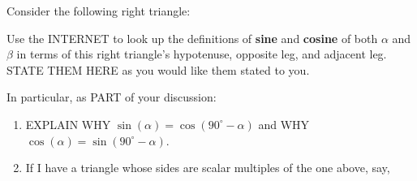 \documentclass[handout,noauthor,nooutcomes,12pt,hints]{ximera}
\begin{document}
\begin{question}
  Consider the following right triangle:
  \begin{center}
    \end{center}
  Use the INTERNET to look up the definitions of \textbf{sine} and
  \textbf{cosine} of both $\alpha$ and $\beta$ in terms of this right
  triangle's hypotenuse, opposite leg, and adjacent leg. STATE THEM
  HERE as you would like them stated to you.


  In particular, as PART of your discussion:
  \begin{enumerate}
    \item EXPLAIN WHY $\sin(\alpha) = \cos(90^\circ-\alpha)$ and WHY
      $\cos(\alpha) = \sin(90^\circ-\alpha)$.
    \item If I have a triangle whose sides are scalar multiples of
      the one above, say,
      \begin{center}
\end{center}
\end{enumerate}
\end{question}
\end{document}
